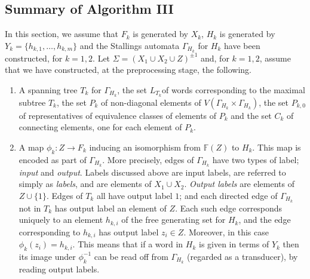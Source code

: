 \documentclass[a4paper,12pt]{article}
\newcommand{\G}{\Gamma }
\renewcommand{\S}{\Sigma }
\numberwithin{equation}{section}
\numberwithin{figure}{section}
\newcommand{\FF}{\ensuremath{\mathbb{F}}}
\newcommand{\maps}{\rightarrow}
\newcommand{\be}{\begin{enumerate}}
\newcommand{\ee}{\end{enumerate}}
\begin{document}
\subsection{Summary of Algorithm III}\label{sub:summaryIII}

In this section, we assume that 
$F_k$ is generated by $X_k$, $H_k$ is generated
by $Y_k=\{h_{k,1},\ldots, h_{k,m}\}$
and the Stallings automata $\G_{H_k}$ for $H_k$ have
been constructed, for $k=1,2$. Let  $\S=(X_1\cup X_2\cup Z)^{\pm 1}$ and, for $k=1,2$,
assume that we have constructed, at the preprocessing stage, the following.
\be
\item
A spanning tree  $T_k$ for $\G_{H_k}$,
 the set $L_{T_k}$of words corresponding to the  maximal subtree $T_k$,
the set $P_k$ of non-diagonal elements of
$V( \G_{H_k}\times \G_{H_k})$,
 the set $P_{k,0}$ of representatives  of equivalence classes of
elements of $P_k$ and the
set $C_k$ of connecting elements, one for each element of $P_k$.
\item A map $\phi_k:Z\maps F_k$  inducing an isomorphism from $\FF(Z)$ to
$H_k$. This map is encoded as part of $\G_{H_k}$. More precisely,
edges of $\G_{H_k}$ have two types of label; \emph{input} and \emph{output}.
Labels discussed above are input labels, are
referred to simply as \emph{labels}, and are elements of $X_1\cup X_2$.
\emph{Output labels} are elements of  $Z\cup \{1\}$.
 Edges of $T_k$  all have output label $1$; and each directed
edge of $\G_{H_k}$ not in $T_k$ has output
label an element of $Z$. Each such edge corresponds uniquely to
 an element $h_{k,i}$ of the free generating set for $H_k$, and the edge
corresponding to $h_{k,i}$ has
 output label  $z_i\in Z$. Moreover, in this case $\phi_k(z_i)=h_{k,i}$.
  This means that if a word in $H_k$ is given in terms of $Y_k$  then its
image under $\phi_k^{-1}$ can be read off from $\G_{H_k}$ (regarded as a
 transducer), by reading output labels.
\ee
\end{document}

